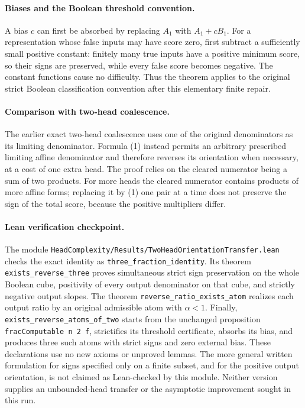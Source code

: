 \documentclass{article}
\begin{document}
\paragraph{Biases and the Boolean threshold convention.}
A bias $c$ can first be absorbed by replacing $A_1$ with $A_1+cB_1$.
For a representation whose false inputs may have score zero, first
subtract a sufficiently small positive constant: finitely many true
inputs have a positive minimum score, so their signs are preserved,
while every false score becomes negative. The constant functions
cause no difficulty. Thus the theorem applies to the original strict
Boolean classification convention after this elementary finite repair.

\paragraph{Comparison with two-head coalescence.}
The earlier exact two-head coalescence uses one of the original
denominators as its limiting denominator. Formula (1) instead permits
an arbitrary prescribed limiting affine denominator and therefore
reverses its orientation when necessary, at a cost of one extra head.
The proof relies on the cleared numerator being a sum of two products.
For more heads the cleared numerator contains products of more affine
forms; replacing it by (1) one pair at a time does not preserve the
sign of the total score, because the positive multipliers differ.

\paragraph{Lean verification checkpoint.}
The module
\texttt{HeadComplexity/Results/TwoHeadOrientationTransfer.lean}
checks the exact identity as \texttt{three\_fraction\_identity}.
Its theorem \texttt{exists\_reverse\_three} proves simultaneous strict
sign preservation on the whole Boolean cube, positivity of every
output denominator on that cube, and strictly negative output slopes.
The theorem \texttt{reverse\_ratio\_exists\_atom} realizes each output
ratio by an original admissible atom with $\alpha<1$.
Finally, \texttt{exists\_reverse\_atoms\_of\_two} starts from the
unchanged proposition \texttt{fracComputable n 2 f}, strictifies its
threshold certificate, absorbs its bias, and produces three such
atoms with strict signs and zero external bias. These declarations
use no new axioms or unproved lemmas. The more general written
formulation for signs specified only on a finite subset, and for
the positive output orientation, is not claimed as Lean-checked by
this module. Neither version supplies an unbounded-head transfer
or the asymptotic improvement sought in this run.
\end{document}
